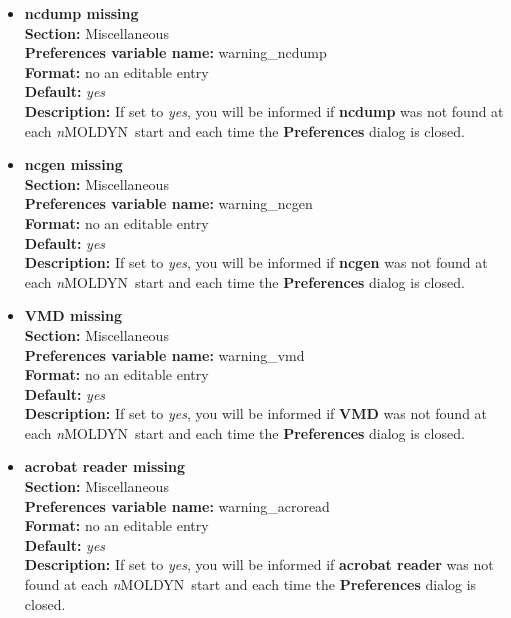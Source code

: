 \documentclass[a4paper,11pt]{report}
\newcommand{\NMOLDYN}{\textit{n}MOLDYN}
\begin{document}
\begin{itemize}
\item \textbf{ncdump missing}\\
\textbf{Section:} Miscellaneous\\
\textbf{Preferences variable name:} warning\_ncdump\\
\textbf{Format:} no an editable entry\\
\textbf{Default:} \textit{yes}\\
\textbf{Description:} If set to \textit{yes}, you will be informed if \textbf{ncdump} was not found at each \NMOLDYN\ start 
and each time the \textbf{Preferences} dialog is closed.

\item \textbf{ncgen missing}\\
\textbf{Section:} Miscellaneous\\
\textbf{Preferences variable name:} warning\_ncgen\\
\textbf{Format:} no an editable entry\\
\textbf{Default:} \textit{yes}\\
\textbf{Description:} If set to \textit{yes}, you will be informed if \textbf{ncgen} was not found at each \NMOLDYN\ start 
and each time the \textbf{Preferences} dialog is closed.

\item \textbf{VMD missing}\\
\textbf{Section:} Miscellaneous\\
\textbf{Preferences variable name:} warning\_vmd\\
\textbf{Format:} no an editable entry\\
\textbf{Default:} \textit{yes}\\
\textbf{Description:} If set to \textit{yes}, you will be informed if \textbf{VMD} was not found at each \NMOLDYN\ start 
and each time the \textbf{Preferences} dialog is closed.

\item \textbf{acrobat reader missing}\\
\textbf{Section:} Miscellaneous\\
\textbf{Preferences variable name:} warning\_acroread\\
\textbf{Format:} no an editable entry\\
\textbf{Default:} \textit{yes}\\
\textbf{Description:} If set to \textit{yes}, you will be informed if \textbf{acrobat reader} was not found at each \NMOLDYN\ start 
and each time the \textbf{Preferences} dialog is closed.
\end{itemize}
\end{document}
